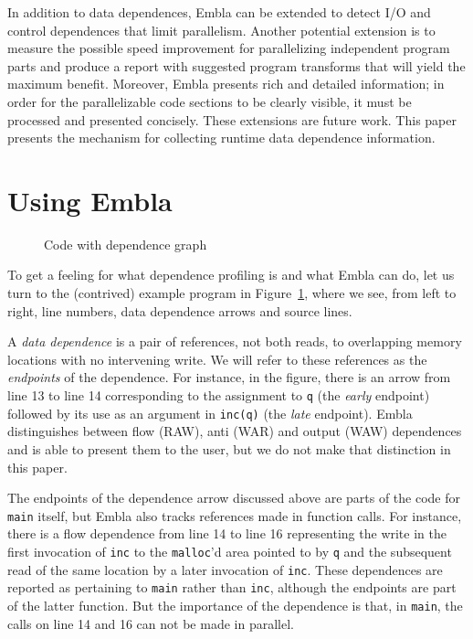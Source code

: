 \documentclass[times, 10pt,twocolumn]{article}
\begin{document}
In addition to data dependences, Embla can be extended to
detect I/O and control dependences that limit parallelism.  Another potential
extension is to measure the possible speed
improvement for parallelizing independent program parts and produce a
report with suggested program transforms that will yield the maximum
benefit.  Moreover, Embla presents rich and detailed information; in order
for the parallelizable code sections to be clearly visible, it must be
processed and presented concisely.  These extensions are future work.
This paper
presents the mechanism for collecting runtime data dependence information.



\section{Using Embla}

\begin{figure} 
\small

\caption{Code with dependence graph} \label{ffirstex}
\end{figure}

To get a feeling for what dependence profiling is and what Embla can do, 
let us turn to the (contrived) example program in Figure~\ref{ffirstex},
where we see, from left to right, line numbers, data dependence 
arrows and source lines. 

A {\em data dependence} is a pair
of references, not both reads, to overlapping memory
locations with no intervening write. We will refer to these
references as the {\em endpoints} of the dependence.
For instance, in the figure, 
there is an arrow from line 13 to line 14 corresponding to
the assignment to {\tt q} (the {\em early} endpoint) followed by its use 
as an argument in {\tt inc(q)} (the {\em late} endpoint). Embla
distinguishes between flow (RAW), anti (WAR) and output (WAW) 
dependences and is able to present them to the user, but we do not make
that distinction in this paper. 

The endpoints of the dependence arrow discussed above are parts of
the code for {\tt main} itself, but Embla also tracks references made 
in function calls. For
instance, there is a flow dependence from line 14 to line 16
representing the write in the first invocation of {\tt inc} to the 
{\tt malloc}'d area pointed to by {\tt q} and the subsequent read 
of the same location by a later invocation of {\tt inc}. 
These dependences 
are reported as pertaining to {\tt main} rather than {\tt inc},
although the endpoints are part of the latter function. 
But the importance of the dependence is that, in {\tt main}, the calls
on line 14 and 16 can not be made in parallel.
\end{document}
